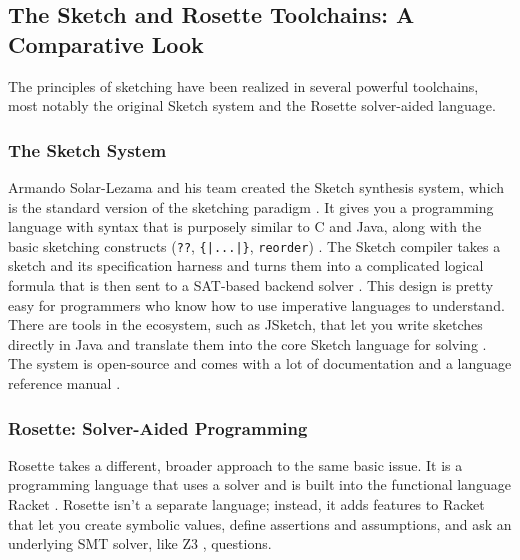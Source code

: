 \documentclass[12pt, a4paper]{report}
\begin{document}
\subsection{The Sketch and Rosette Toolchains: A Comparative Look}
The principles of sketching have been realized in several powerful toolchains, most notably the original Sketch system and the Rosette solver-aided language.

\subsubsection{The Sketch System}
Armando Solar-Lezama and his team created the Sketch synthesis system, which is the standard version of the sketching paradigm \citep{solar2008program}.  It gives you a programming language with syntax that is purposely similar to C and Java, along with the basic sketching constructs (\texttt{??}, \texttt{\{|...|\}}, \texttt{reorder}) \citep{solar2008program}.  The Sketch compiler takes a sketch and its specification harness and turns them into a complicated logical formula that is then sent to a SAT-based backend solver \citep{solar2008combinatorial}.  This design is pretty easy for programmers who know how to use imperative languages to understand.  There are tools in the ecosystem, such as JSketch, that let you write sketches directly in Java and translate them into the core Sketch language for solving \citep{singh2016jsketch}.  The system is open-source and comes with a lot of documentation and a language reference manual \citep{solar2013sketch}.

\subsubsection{Rosette: Solver-Aided Programming}
Rosette takes a different, broader approach to the same basic issue.  It is a programming language that uses a solver and is built into the functional language Racket \citep{torlak2013rosette}.  Rosette isn't a separate language; instead, it adds features to Racket that let you create symbolic values, define assertions and assumptions, and ask an underlying SMT solver, like Z3 \citep{torlak2013rosette}, questions.
\end{document}
